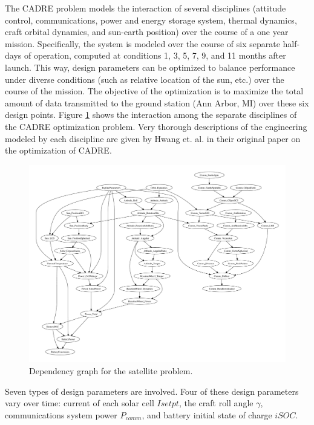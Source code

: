 \documentclass[]{aiaa-tc} %
\begin{document}
The CADRE problem models the interaction of several disciplines (attitude control, communications, power and energy
storage system, thermal dynamics, craft orbital dynamics, and sun-earth position) over the course of a one year mission.
Specifically, the system is modeled over the course of six separate half-days of operation, computed at conditions
1, 3, 5, 7, 9, and 11 months after launch. This way, design parameters can be optimized to balance performance under
diverse conditions (such as relative location of the sun, etc.) over the course of the mission. The objective of the
optimization is to maximize the total amount of data transmitted to the ground station (Ann Arbor, MI) over these six
design points. Figure \ref{fig:cadre_graph} shows the interaction among the separate disciplines of the CADRE optimization problem. Very thorough descriptions of the engineering modeled by each discipline are given by Hwang et. al. in their original paper on the optimization of CADRE\cite{CADRE2012}.

        \begin{figure}[!htb]\begin{center}
          \includegraphics[width=1.1\textwidth]{images/CADRE.pdf}
          \caption{ Dependency graph for the satellite problem. \label{fig:cadre_graph}}
        \end{center}\end{figure}

Seven types of design parameters are involved. Four of these design parameters vary over time: current of each solar
cell $Isetpt$, the craft roll angle $\gamma$, communications system power $P_{comm}$, and battery initial state of
charge $iSOC$.
\end{document}
